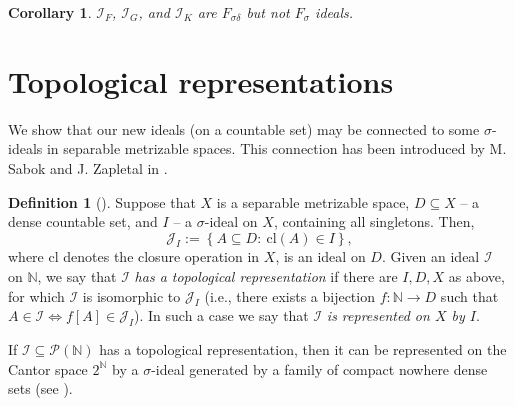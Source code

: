 \documentclass{amsart}
\newtheorem{cor}[thm]{Corollary}
\theoremstyle{definition}
\newtheorem{df}[thm]{Definition}
\theoremstyle{definition}
\newcommand{\N}{{\mathbb N}}
\newcommand{\I}{\mathcal I}
\newcommand{\cl}{\mathrm{cl}}
\begin{document}
\begin{cor}
$\I_F$, $\I_G$, and $\I_K$ are $F_{\sigma\delta}$ but not $F_{\sigma}$ ideals.
\end{cor}







\section{Topological representations}

We show that our new ideals (on a countable set) may be connected to some $\sigma$-ideals in separable metrizable spaces. This connection has been introduced by M. Sabok and J. Zapletal in \cite{Sabok}. 

\begin{df}[\cite{Sabok}]
Suppose that $X$ is a separable metrizable space, $D\subseteq X$ -- a dense countable set, and $I$ -- a $\sigma$-ideal on $X$, containing all singletons. Then,
$$\mathcal{J}_I:=\left\{A\subseteq D :\ \cl(A)\in I\right\},$$
where $\cl$ denotes the closure operation in $X$,
is an ideal on $D$. Given an ideal $\mathcal{I}$ on $\N$, we say that $\mathcal{I}$ \emph{has a topological representation} if there are $I,D,X$ as above, for which $\mathcal{I}$ is isomorphic to $\mathcal{J}_I$ (i.e., there exists a bijection $f\colon \N\to D$ such that $A\in\I \Leftrightarrow f[A]\in\mathcal{J}_I$). In such a case we say that $\mathcal{I}$ \emph{is represented on $X$ by $I$}.
\end{df}


If $\mathcal{I}\subseteq\mathcal{P}(\N)$ has a topological representation, then it can be represented on the Cantor space $2^\N$ by a $\sigma$-ideal generated by a family of compact nowhere dense sets (see \cite[Corollary 1.3]{Adas}). 
\end{document}
